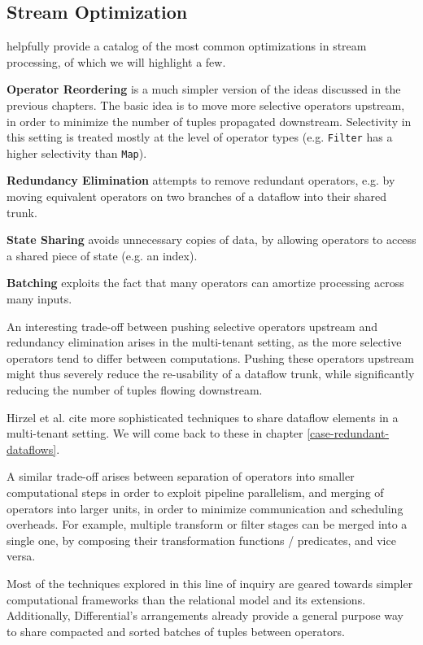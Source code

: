 \documentclass[../index.tex]{subfiles}
\begin{document}
\subsection{Stream Optimization}

\cite{hirzel2014catalog} helpfully provide a catalog of the most
common optimizations in stream processing, of which we will highlight
a few.

\textbf{Operator Reordering} is a much simpler version of the ideas
discussed in the previous chapters. The basic idea is to move more
selective operators upstream, in order to minimize the number of
tuples propagated downstream. Selectivity in this setting is treated
mostly at the level of operator types (e.g. \texttt{Filter} has a
higher selectivity than \texttt{Map}).

\textbf{Redundancy Elimination} attempts to remove redundant operators,
e.g. by moving equivalent operators on two branches of a dataflow into
their shared trunk.

\textbf{State Sharing} avoids unnecessary copies of data, by allowing
operators to access a shared piece of state (e.g. an index).

\textbf{Batching} exploits the fact that many operators can amortize
processing across many inputs.

An interesting trade-off between pushing selective operators upstream
and redundancy elimination arises in the multi-tenant setting, as the
more selective operators tend to differ between computations. Pushing
these operators upstream might thus severely reduce the re-usability
of a dataflow trunk, while significantly reducing the number of tuples
flowing downstream. 

Hirzel et al. cite more sophisticated techniques to share dataflow
elements in a multi-tenant setting. We will come back to these in
chapter \ref{case-redundant-dataflows}.

A similar trade-off arises between separation of operators into
smaller computational steps in order to exploit pipeline parallelism,
and merging of operators into larger units, in order to minimize
communication and scheduling overheads. For example, multiple
transform or filter stages can be merged into a single one, by
composing their transformation functions / predicates, and vice versa.

Most of the techniques explored in this line of inquiry are geared
towards simpler computational frameworks than the relational model and
its extensions. Additionally, Differential's arrangements already
provide a general purpose way to share compacted and sorted batches of
tuples between operators.
\end{document}
